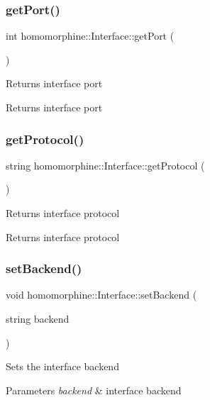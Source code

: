 \subsubsection{\texorpdfstring{getPort()}{getPort()}}
{\footnotesize\ttfamily int homomorphine\+::\+Interface\+::get\+Port (\begin{DoxyParamCaption}{ }\end{DoxyParamCaption})}

Returns interface port

\begin{DoxyReturn}{Returns}
interface port 
\end{DoxyReturn}
\mbox{\label{classhomomorphine_1_1_interface_afa73852700146c2957b425c8c0b19c55}} 
\subsubsection{\texorpdfstring{getProtocol()}{getProtocol()}}
{\footnotesize\ttfamily string homomorphine\+::\+Interface\+::get\+Protocol (\begin{DoxyParamCaption}{ }\end{DoxyParamCaption})}

Returns interface protocol

\begin{DoxyReturn}{Returns}
interface protocol 
\end{DoxyReturn}
\mbox{\label{classhomomorphine_1_1_interface_a46885f3cab9a833941201dceb370a6f4}} 
\subsubsection{\texorpdfstring{setBackend()}{setBackend()}}
{\footnotesize\ttfamily void homomorphine\+::\+Interface\+::set\+Backend (\begin{DoxyParamCaption}\item[{string}]{backend }\end{DoxyParamCaption})}

Sets the interface backend


\begin{DoxyParams}{Parameters}
{\em backend} & interface backend \\
\hline
\end{DoxyParams}
\mbox{\label{classhomomorphine_1_1_interface_aa250a3c50c6eb1236ca6ee978ab474f1}} 
